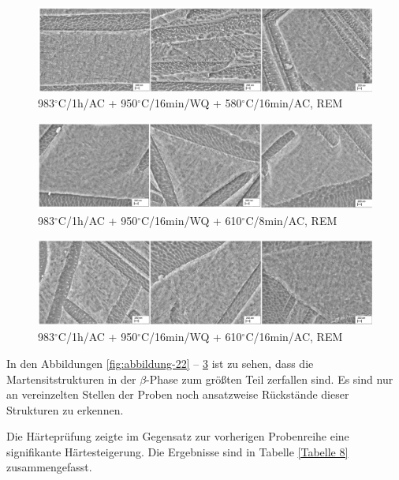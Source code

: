 \begin{figure}
	\centering
	\includegraphics[width=1.0\linewidth]{./Bilder/Abbildung 23.png}
	\caption[Abbildung 23]{983$^\circ$C/1h/AC + 950$^\circ$C/16min/WQ + 580$^\circ$C/16min/AC, REM}
	\label{fig:abbildung-23}
\end{figure}

\begin{figure}
	\centering
	\includegraphics[width=1.0\linewidth]{./Bilder/Abbildung 24.png}
	\caption[Abbildung 24]{983$^\circ$C/1h/AC + 950$^\circ$C/16min/WQ + 610$^\circ$C/8min/AC, REM}
	\label{fig:abbildung-24}
\end{figure}

\begin{figure}
	\centering
	\includegraphics[width=1.0\linewidth]{./Bilder/Abbildung 25.png}
	\caption[Abbildung 25]{983$^\circ$C/1h/AC + 950$^\circ$C/16min/WQ + 610$^\circ$C/16min/AC, REM}
	\label{fig:abbildung-25}
\end{figure}

In den Abbildungen \ref{fig:abbildung-22} -- \ref{fig:abbildung-25} ist zu sehen, dass die Martensitstrukturen in der $\beta$-Phase zum größten Teil zerfallen sind. Es sind nur an vereinzelten Stellen der Proben noch ansatzweise Rückstände dieser Strukturen zu erkennen.

Die Härteprüfung zeigte im Gegensatz zur vorherigen Probenreihe eine signifikante Härtesteigerung. Die Ergebnisse sind in Tabelle \ref{Tabelle 8} zusammengefasst.


